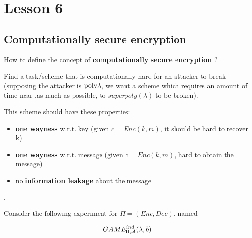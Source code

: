 \chapter*{Lesson 6}

\section{Computationally secure encryption}

\begin{question}
    How to define the concept of \textbf{computationally secure encryption} ?    
\end{question}

Find a task/scheme that is computationally hard for an attacker to break
(supposing the attacker is $ \mathrm{poly}{\lambda} $, we want a scheme which requires
an amount of time near ,as much as possible, to $superpoly(\lambda)$ to be
broken).

This scheme should have these properties:
\begin{itemize}
    \item \label{prop:owk} \textbf{one wayness} w.r.t. key (given $c=Enc(k,m)$,
        it should be hard to recover k) 
    \item \label{prop:owm} \textbf{one wayness}  w.r.t. message (given
        $c=Enc(k,m)$, hard to obtain the message)
    \item \label{prop:nol} no \textbf{information leakage} about the message
\end{itemize}.

Consider the following experiment for $\Pi=(Enc, Dec)$, named 

\[
    GAME_{\Pi, \mathcal{A}}^{ind}(\lambda, b)
\]


\begin{figure}[h!]
   \centering
   \sdinit{}
   \caption{}
   \label{fig:knowmess}
\end{figure}

